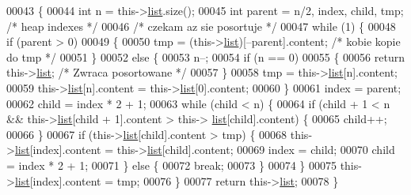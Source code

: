\begin{DoxyCode}
00043         \{
00044                 \textcolor{keywordtype}{int} n = this->\hyperlink{class_heap_sorter_a6b8ac615ff2de0c2e510ad215d0508d9}{list}.size();
00045             \textcolor{keywordtype}{int} parent = n/2, index, child, tmp; \textcolor{comment}{/* heap indexes */}
00046             \textcolor{comment}{/* czekam az sie posortuje */}
00047             \textcolor{keywordflow}{while} (1) \{
00048                 \textcolor{keywordflow}{if} (parent > 0)
00049                 \{
00050                     tmp = (this->\hyperlink{class_heap_sorter_a6b8ac615ff2de0c2e510ad215d0508d9}{list})[--parent].content;  \textcolor{comment}{/* kobie kopie do tmp */}
00051                 \}
00052                 \textcolor{keywordflow}{else} \{
00053                     n--;
00054                     \textcolor{keywordflow}{if} (n == 0)
00055                     \{
00056                         \textcolor{keywordflow}{return} this->\hyperlink{class_heap_sorter_a6b8ac615ff2de0c2e510ad215d0508d9}{list}; \textcolor{comment}{/* Zwraca posortowane */}
00057                     \}
00058                     tmp = this->\hyperlink{class_heap_sorter_a6b8ac615ff2de0c2e510ad215d0508d9}{list}[n].content;
00059                     this->\hyperlink{class_heap_sorter_a6b8ac615ff2de0c2e510ad215d0508d9}{list}[n].content = this->\hyperlink{class_heap_sorter_a6b8ac615ff2de0c2e510ad215d0508d9}{list}[0].content;
00060                 \}
00061                 index = parent;
00062                 child = index * 2 + 1;
00063                 \textcolor{keywordflow}{while} (child < n) \{
00064                     \textcolor{keywordflow}{if} (child + 1 < n  &&  this->\hyperlink{class_heap_sorter_a6b8ac615ff2de0c2e510ad215d0508d9}{list}[child + 1].content > this->
      \hyperlink{class_heap_sorter_a6b8ac615ff2de0c2e510ad215d0508d9}{list}[child].content) \{
00065                         child++;
00066                     \}
00067                     \textcolor{keywordflow}{if} (this->\hyperlink{class_heap_sorter_a6b8ac615ff2de0c2e510ad215d0508d9}{list}[child].content > tmp) \{
00068                         this->\hyperlink{class_heap_sorter_a6b8ac615ff2de0c2e510ad215d0508d9}{list}[index].content = this->\hyperlink{class_heap_sorter_a6b8ac615ff2de0c2e510ad215d0508d9}{list}[child].content;
00069                         index = child;
00070                         child = index * 2 + 1;
00071                     \} \textcolor{keywordflow}{else} \{
00072                         \textcolor{keywordflow}{break};
00073                     \}
00074                 \}
00075                 this->\hyperlink{class_heap_sorter_a6b8ac615ff2de0c2e510ad215d0508d9}{list}[index].content = tmp;
00076             \}
00077             \textcolor{keywordflow}{return} this->\hyperlink{class_heap_sorter_a6b8ac615ff2de0c2e510ad215d0508d9}{list};
00078         \}
\end{DoxyCode}



